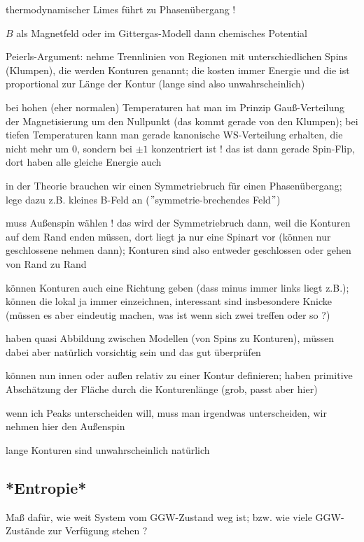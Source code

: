 \documentclass[../KlassMech_main.tex]{subfiles}
\begin{document}
thermodynamischer Limes führt zu Phasenübergang !



$B$ als Magnetfeld oder im Gittergas-Modell dann chemisches Potential

Peierls-Argument: nehme Trennlinien von Regionen mit unterschiedlichen Spins (Klumpen), die werden Konturen genannt; die kosten immer Energie und die ist proportional zur Länge der Kontur (lange sind also unwahrscheinlich)

bei hohen (eher normalen) Temperaturen hat man im Prinzip Gauß-Verteilung der Magnetisierung um den Nullpunkt (das kommt gerade von den Klumpen); bei tiefen Temperaturen kann man gerade kanonische WS-Verteilung erhalten, die nicht mehr um 0, sondern bei $\pm 1$ konzentriert ist ! das ist dann gerade Spin-Flip, dort haben alle gleiche Energie auch

in der Theorie brauchen wir einen Symmetriebruch für einen Phasenübergang; lege dazu z.B. kleines B-Feld an ($"$symmetrie-brechendes Feld$"$)

muss Außenspin wählen ! das wird der Symmetriebruch dann, weil die Konturen auf dem Rand enden müssen, dort liegt ja nur eine Spinart vor (können nur geschlossene nehmen dann); Konturen sind also entweder geschlossen oder gehen von Rand zu Rand

können Konturen auch eine Richtung geben (dass minus immer links liegt z.B.); können die lokal ja immer einzeichnen, interessant sind insbesondere Knicke (müssen es aber eindeutig machen, was ist wenn sich zwei treffen oder so ?)

haben quasi Abbildung zwischen Modellen (von Spins zu Konturen), müssen dabei aber natürlich vorsichtig sein und das gut überprüfen

können nun innen oder außen relativ zu einer Kontur definieren; haben primitive Abschätzung der Fläche durch die Konturenlänge (grob, passt aber hier)

wenn ich Peaks unterscheiden will, muss man irgendwas unterscheiden, wir nehmen hier den Außenspin

lange Konturen sind unwahrscheinlich natürlich



	\subsection{*Entropie*}
Maß dafür, wie weit System vom GGW-Zustand weg ist; bzw. wie viele GGW-Zustände zur Verfügung stehen ?
\end{document}
